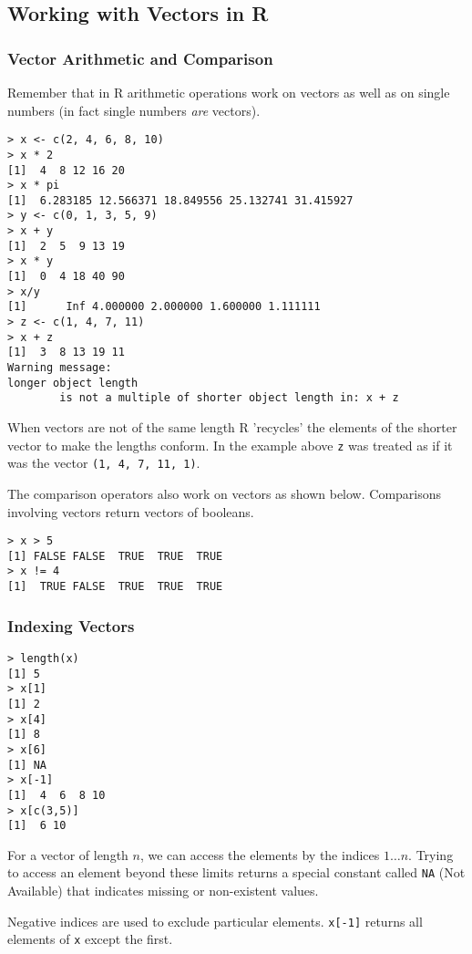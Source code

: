\documentclass{article}
\begin{document}
\subsection{Working with Vectors in R}

\subsubsection{Vector Arithmetic and Comparison}

Remember that in R arithmetic operations work on vectors as well as on
single numbers (in fact single numbers \emph{are} vectors).

\begin{lstlisting}
> x <- c(2, 4, 6, 8, 10)
> x * 2
[1]  4  8 12 16 20
> x * pi
[1]  6.283185 12.566371 18.849556 25.132741 31.415927
> y <- c(0, 1, 3, 5, 9)
> x + y
[1]  2  5  9 13 19
> x * y
[1]  0  4 18 40 90
> x/y
[1]      Inf 4.000000 2.000000 1.600000 1.111111
> z <- c(1, 4, 7, 11)
> x + z
[1]  3  8 13 19 11
Warning message:
longer object length
        is not a multiple of shorter object length in: x + z 
\end{lstlisting}
When vectors are not of the same length R 'recycles' the elements of the
shorter vector to make the lengths conform. In the example above
\lstinline!z! was treated as if it was the vector
\lstinline!(1, 4, 7, 11, 1)!.

The comparison operators also work on vectors as shown below.
Comparisons involving vectors return vectors of booleans.

\begin{lstlisting}
> x > 5
[1] FALSE FALSE  TRUE  TRUE  TRUE
> x != 4
[1]  TRUE FALSE  TRUE  TRUE  TRUE
\end{lstlisting}
\subsubsection{Indexing Vectors}

\begin{lstlisting}
> length(x)
[1] 5
> x[1]
[1] 2
> x[4]
[1] 8
> x[6]
[1] NA
> x[-1]
[1]  4  6  8 10
> x[c(3,5)]
[1]  6 10
\end{lstlisting}
For a vector of length $n$, we can access the elements by the indices
$1 \ldots n$. Trying to access an element beyond these limits returns a
special constant called \lstinline!NA! (Not Available) that indicates
missing or non-existent values.

Negative indices are used to exclude particular elements.
\lstinline!x[-1]! returns all elements of \lstinline!x! except the
first.
\end{document}
